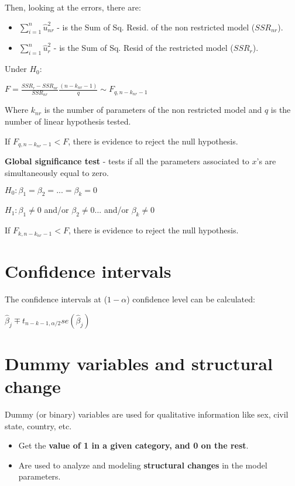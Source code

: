 \documentclass[10pt, a4paper, landscape]{extarticle}
\begin{document}
\begin{multicols}{3}
Then, looking at the errors, there are:

\begin{itemize}[leftmargin=*]
\item \textbf{$\sum_{i=1}^n \hat{u}_{nr}^2$} - is the Sum of Sq. Resid. of the non restricted model ($SSR_{nr}$).
\item \textbf{$\sum_{i=1}^n \hat{u}_r^2$} - is the Sum of Sq. Resid of the restricted model ($SSR_r$).
\end{itemize}

Under $H_0$:

\begin{center}
$F = \frac{SSR_r - SSR_{nr}}{SSR_{nr}} \frac{(n-k_{nr}-1)}{q} \sim F_{q, n-k_{nr}-1}$
\end{center}

Where $k_{nr}$ is the number of parameters of the non restricted model and $q$ is the number of linear hypothesis tested.

If $F_{q, n-k_{nr}-1} < F$, there is evidence to reject the null hypothesis.

\textbf{Global significance test} - tests if all the parameters associated to $x$'s are simultaneously equal to zero.

$H_0: \beta_1 = \beta_2 = ... = \beta_k = 0$

$H_1: \beta_1 \neq 0$ and/or $\beta_2 \neq 0 ...$ and/or $\beta_k \neq 0$

If $F_{k, n-k_{nr}-1} < F$, there is evidence to reject the null hypothesis.

\section*{Confidence intervals}

The confidence intervals at ($1 - \alpha$) confidence level can be calculated:

\begin{center}
$\hat{\beta}_j \mp t_{n-k-1, \alpha/2} se(\hat{\beta}_j)$
\end{center}

\section*{Dummy variables and structural change}

Dummy (or binary) variables are used for qualitative information like sex, civil state, country, etc.

\begin{itemize}[leftmargin=*]
\item Get the \textbf{value of 1 in a given category, and 0 on the rest}.
\item Are used to analyze and modeling \textbf{structural changes} in the model parameters.
\end{itemize}


\end{multicols}
\end{document}
